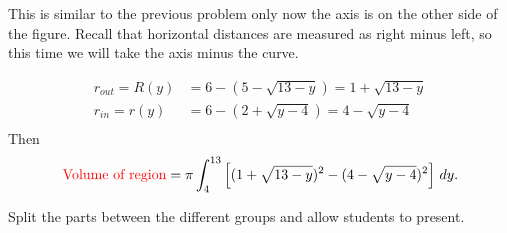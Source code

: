\documentclass[noinstructornotes]{ximera}
\begin{document}
\begin{problem}
\begin{enumerate}
		\begin{freeResponse}
		This is similar to the previous problem only now the axis is on the other side of the figure.  Recall that horizontal distances are measured as right minus left, so this time we will take the axis minus the curve.

			\begin{align*}
			r_{out} = R(y) &= 6 - (5 - \sqrt{13-y}) = 1 + \sqrt{13-y}  \\
			r_{in} = r(y) &= 6 - (2 + \sqrt{y-4}) =  4 - \sqrt{y-4}  \\
			\end{align*}
		Then
			\[
			\text{{\color{red} Volume of region}} = \pi \int_4^{13} \left[ (1 + \sqrt{13-y})^2 - (4 - \sqrt{y-4})^2 \right] \,d y.
			\]
			

	
		\end{freeResponse}
		
		
		
	\end{enumerate}
		
\end{problem}

\begin{instructorNotes}
Split the parts between the different groups and allow students to present.
\end{instructorNotes}
\end{document}
